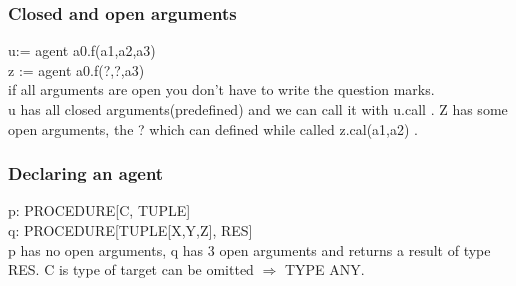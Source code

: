 \documentclass[11pt]{article}
\begin{document}
\subsubsection{Closed and open arguments}
u:= agent a0.f(a1,a2,a3)\\
z := agent a0.f(?,?,a3)\\
if all arguments are open you don't have to write the question marks.\\
u has all closed arguments(predefined) and we can call it with u.call   . Z has some open arguments, the ? which can defined while called z.cal(a1,a2)   .
\subsubsection{Declaring an agent}
p: PROCEDURE[C, TUPLE]\\
q: PROCEDURE[TUPLE[X,Y,Z], RES]\\
p has no open arguments, q has 3 open arguments and returns a result of type RES. C is type of target can be omitted $\Rightarrow$ TYPE ANY.
\end{document}
